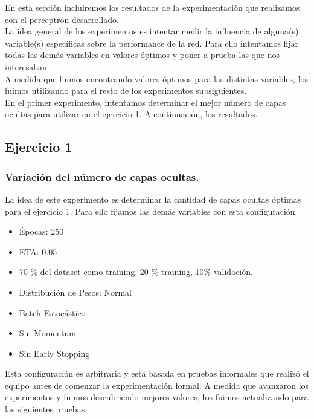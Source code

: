 En esta sección incluiremos los resultados de la experimentación que realizamos con el perceptrón desarrollado.\\
La idea general de los experimentos es intentar medir la influencia de alguna(s) variable(s) específicas sobre la performance
de la red. Para ello intentamos fijar todas las demás variables en valores óptimos y poner a prueba las que nos interesaban.\\

A medida que fuimos encontrando valores óptimos para las distintas variables, los fuimos utilizando para el resto de los experimentos subsiguientes.\\

En el primer experimento, intentamos determinar el mejor número de capas ocultas para utilizar en el ejercicio 1. A continuación, los resultados.


\subsection{Ejercicio 1}

\subsubsection{Variación del número de capas ocultas.}
La idea de este experimento es determinar la cantidad de capas ocultas óptimas para el ejercicio 1. Para ello fijamos las demás variables con esta configuración:

\begin{itemize}
\item Épocas: 250
\item ETA: 0.05
\item 70 \% del dataset como training, 20 \% training, 10\% validación.
\item Distribución de Pesos: Normal
\item Batch Estocástico
\item Sin Momentum
\item Sin Early Stopping
\end{itemize}

Esta configuración es arbitraria y está basada en pruebas informales que realizó el equipo antes de comenzar la experimentación formal. A medida que avanzaron los experimentos y fuimos descubriendo mejores valores, los fuimos actualizando para las siguientes pruebas.\\

